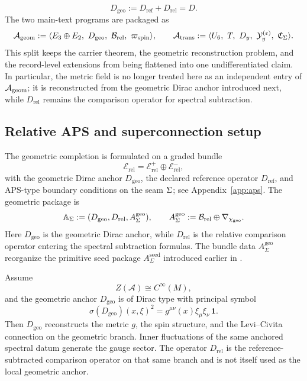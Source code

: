 \[
D_{\mathrm{geo}}:=D_{\mathrm{ref}}+D_{\mathrm{rel}}=D.
\]
The two main-text programs are packaged as
\[
\Ageom
:=
\langle E_3\oplus E_2,\ D_{\mathrm{geo}},\ \mathcal B_{\mathrm{rel}},\ \wspin\rangle,
\qquad
\Atrans
:=
\langle U_6,\ T,\ D_y,\ \mathcal Y_y^{(\varepsilon)},\ \Ccyc\rangle.
\]
This split keeps the carrier theorem, the geometric reconstruction problem, and the record-level extensions from being flattened into one undifferentiated claim. In particular, the metric field is no longer treated here as an independent entry of $\mathcal A_{\mathrm{geom}}$; it is reconstructed from the geometric Dirac anchor introduced next, while $D_{\mathrm{rel}}$ remains the comparison operator for spectral subtraction.

\subsection{Relative APS and superconnection setup}

The geometric completion is formulated on a graded bundle
\[
\mathcal E_{\mathrm{rel}}=\mathcal E_{\mathrm{rel}}^+\oplus\mathcal E_{\mathrm{rel}}^-,
\]
with the geometric Dirac anchor $D_{\mathrm{geo}}$, the declared reference operator
$D_{\mathrm{ref}}$, and APS-type boundary conditions on the seam $\Sigma$; see
Appendix~\ref{app:aps}. The geometric package is
\[
\mathbb A_{\Sigma}:=(D_{\mathrm{geo}},D_{\mathrm{rel}},A_{\Sigma}^{\mathrm{geo}}),
\qquad
A_{\Sigma}^{\mathrm{geo}}:=\mathcal B_{\mathrm{rel}}\oplus\nabla_{\chi_{\mathrm{geo}}}.
\]
Here $D_{\mathrm{geo}}$ is the geometric Dirac anchor, while $D_{\mathrm{rel}}$ is the relative comparison operator entering the spectral subtraction formulas. The bundle data $A_{\Sigma}^{\mathrm{geo}}$ reorganize the primitive seed package $A_{\Sigma}^{\mathrm{seed}}$ introduced earlier in .
\begin{theorem}
\label{thm:geometric-reconstruction-anchor}
\label{thm:geometric-reconstruction-from-Dgeo}
\label{thm:relative-geometric-reconstruction}
Assume
\[
Z(\mathcal A)\cong C^\infty(M),
\]
and the geometric anchor $D_{\mathrm{geo}}$ is of Dirac type with principal symbol
\[
\sigma(D_{\mathrm{geo}})(x,\xi)^2
=
g^{\mu\nu}(x)\xi_\mu\xi_\nu\,\mathbf 1.
\]
Then $D_{\mathrm{geo}}$ reconstructs the metric $g$, the spin structure, and the
Levi--Civita connection on the geometric branch. Inner fluctuations of the same anchored
spectral datum generate the gauge sector.
The operator $D_{\mathrm{rel}}$ is the reference-subtracted comparison operator on that
same branch and is not itself used as the local geometric anchor.
\end{theorem}


